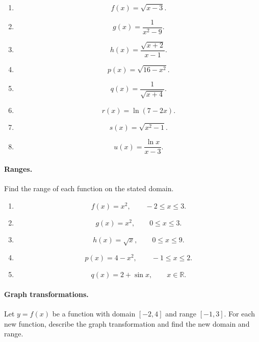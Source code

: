 \begin{enumerate}
\item

\[
f(x)=\sqrt{x-3}.
\]

\item

\[
g(x)=\frac{1}{x^2-9}.
\]

\item

\[
h(x)=\frac{\sqrt{x+2}}{x-1}.
\]

\item

\[
p(x)=\sqrt{16-x^2}.
\]

\item

\[
q(x)=\frac{1}{\sqrt{x+4}}.
\]

\item

\[
r(x)=\ln(7-2x).
\]

\item

\[
s(x)=\sqrt{x^2-1}.
\]

\item

\[
u(x)=\frac{\ln x}{x-3}.
\]
\end{enumerate}

\paragraph{Ranges.}
Find the range of each function on the stated domain.

\begin{enumerate}
\item

\[
f(x)=x^2,\qquad -2\le x\le 3.
\]

\item

\[
g(x)=x^2,\qquad 0\le x\le 3.
\]

\item

\[
h(x)=\sqrt{x},\qquad 0\le x\le 9.
\]

\item

\[
p(x)=4-x^2,\qquad -1\le x\le 2.
\]

\item

\[
q(x)=2+\sin x,\qquad x\in\mathbb R.
\]
\end{enumerate}

\paragraph{Graph transformations.}
Let \(y=f(x)\) be a function with domain \([-2,4]\) and range \([-1,3]\). For each new function, describe the graph transformation and find the new domain and range.

